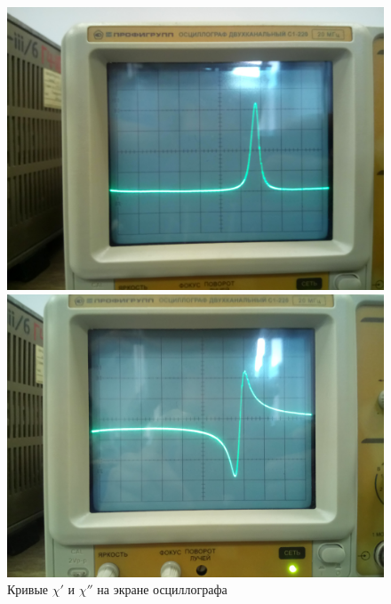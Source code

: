 \begin{figure}[h!]
    \centering
    \begin{minipage}{0.49\linewidth}
    \centering    
    \includegraphics[width=\linewidth]{fig/fig3}
    \end{minipage}
\hfill
    \begin{minipage}{0.49\linewidth}
        \includegraphics[width=\linewidth]{fig/fig2} 
    \centering    
    \end{minipage}

    \caption{Кривые $\chi'$ и  $\chi''$ на экране осциллографа}
    \label{fig:2}
\end{figure}



